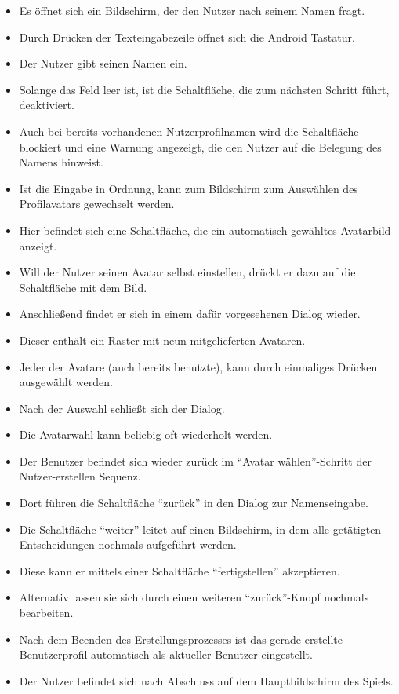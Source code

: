 \begin{itemize}
\item Es öffnet sich ein Bildschirm, der den Nutzer nach seinem Namen fragt.
\item Durch Drücken der Texteingabezeile öffnet sich die Android Tastatur.
\item Der Nutzer gibt seinen Namen ein. 
\item Solange das Feld leer ist, ist die Schaltfläche, die zum nächsten Schritt führt, deaktiviert.
\item  Auch bei bereits vorhandenen Nutzerprofilnamen wird die Schaltfläche blockiert und eine Warnung angezeigt,
die den Nutzer auf die Belegung des Namens hinweist. 
\item Ist die Eingabe in Ordnung, kann zum Bildschirm zum Auswählen des Profilavatars gewechselt werden.
\item Hier befindet sich eine Schaltfläche, die ein automatisch gewähltes Avatarbild anzeigt.
\item Will der Nutzer seinen Avatar selbst einstellen, drückt er dazu auf die Schaltfläche mit dem Bild.
\item Anschließend findet er sich in einem dafür vorgesehenen Dialog wieder.
\item Dieser enthält ein Raster mit neun mitgelieferten Avataren.
\item Jeder der Avatare (auch bereits benutzte), kann durch einmaliges Drücken ausgewählt werden.
\item Nach der Auswahl schließt sich der Dialog.
\item Die Avatarwahl kann beliebig oft wiederholt werden.
\item Der Benutzer befindet sich wieder zurück im "`Avatar wählen"'-Schritt der Nutzer-erstellen Sequenz.
\item Dort führen die Schaltfläche "`zurück"' in den Dialog zur Namenseingabe.
\item Die Schaltfläche "`weiter"' leitet auf einen Bildschirm, in dem alle getätigten Entscheidungen
nochmals aufgeführt werden. 
\item Diese kann er mittels einer Schaltfläche "`fertigstellen"' akzeptieren.
\item Alternativ lassen sie sich durch einen weiteren "`zurück"'-Knopf 
nochmals bearbeiten.
\item Nach dem Beenden des Erstellungsprozesses ist das gerade erstellte 
Benutzerprofil automatisch als aktueller Benutzer eingestellt.
\item Der Nutzer befindet sich nach Abschluss auf dem Hauptbildschirm des Spiels.
\end{itemize}

